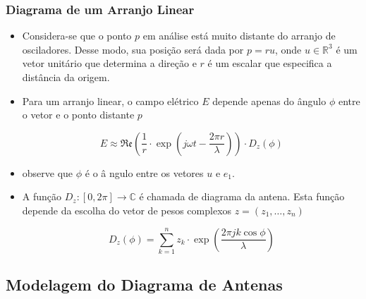 \begin{frame}
\frametitle{Diagrama de um Arranjo Linear}
\begin{itemize}

\item Considera-se que o ponto $p$ em análise está muito distante do arranjo de osciladores. Desse modo, sua posição será dada por $p = ru$, onde $u \in \mathbb{R}^{3}$ é um vetor unitário que determina a direção  e $r$ é um escalar que especifica a distância da origem.

\item Para um arranjo linear, o campo elétrico $E$ depende apenas do ângulo $\phi$ entre o vetor e o ponto distante $p$

\begin{equation}
E \approx \mathfrak{Re} \left(\frac{1}{r}\cdot \exp \left( j\omega t - \frac{2\pi r}{\lambda}\right) \right) \cdot D_{z}\left( \phi \right)
\end{equation}

\item observe que $\phi$ é o â ngulo entre os vetores $u$ e $e_{1}$.

\item A função $D_z : [0, 2\pi]  \to \mathbb{C}$ é chamada de diagrama da antena. Esta função depende da escolha do vetor de pesos complexos $z = \left(z_{1}, \ldots, z_{n} \right)$

\begin{equation}
D_{z} \left( \phi \right) = \sum_{k = 1}^{n} z_{k} \cdot \exp \left( \frac{2 \pi j k \cos{\phi}}{\lambda} \right)
\end{equation}

\end{itemize}
\end{frame}

\subsection{Modelagem do Diagrama de Antenas}

